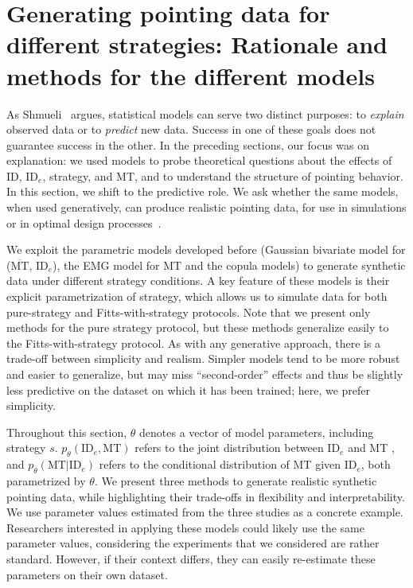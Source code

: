 \documentclass[acmlarge, manuscript,review]{acmart}
\newcommand{\mmt}{\ensuremath{\overline{\mt}}\xspace}
\newcommand{\mt}{\ensuremath{{\text{MT}}}\xspace}
\newcommand{\ide}{\ensuremath{{\text{ID}_e}}\xspace}
\begin{document}






\section{Generating pointing data for different strategies: Rationale and methods for the different models \label{sec:gen}}
As Shmueli~\cite{shmueli2010} argues, statistical models can serve two distinct purposes: to \textit{explain} observed data or to \textit{predict} new data. Success in one of these goals does not guarantee success in the other. In the preceding sections, our focus was on explanation: we used models to probe theoretical questions about the effects of ID, \ide, strategy, and MT, and to understand the structure of pointing behavior. In this section, we shift to the predictive role. We ask whether the same models, when used generatively, can produce realistic pointing data, for use \eg in simulations or in optimal design processes~\cite{oulasvirta2018,murray2022}.




We exploit the parametric models developed before (Gaussian bivariate model for (\mmt, \ide), the EMG model for MT and the copula models) to generate synthetic data under different strategy conditions. A key feature of these models is their explicit parametrization of strategy, which allows us to simulate data for both pure-strategy and Fitts-with-strategy protocols. Note that we present only methods for the pure strategy protocol, but these methods generalize easily to the Fitts-with-strategy protocol.
As with any generative approach, there is a trade-off between simplicity and realism. Simpler models tend to be more robust and easier to generalize, but may miss ``second-order'' effects and thus be slightly less predictive on the dataset on which it has been trained; here, we prefer simplicity.


Throughout this section, $\theta$ denotes a vector of model parameters, including strategy $s$. $p_{\theta}(\ide, \mt)$ refers to the joint distribution between \ide and MT , and $p_{\theta}(\mt|\ide)$ refers to the conditional distribution of MT given \ide, both parametrized by $\theta$. We present three methods to generate realistic synthetic pointing data, while highlighting their trade-offs in flexibility and interpretability.
We use parameter values estimated from the three studies as a concrete example. Researchers interested in applying these models could likely use the same parameter values, considering the experiments that we considered are rather standard. However, if their context differs, they can easily re-estimate these parameters on their own dataset.
\end{document}
